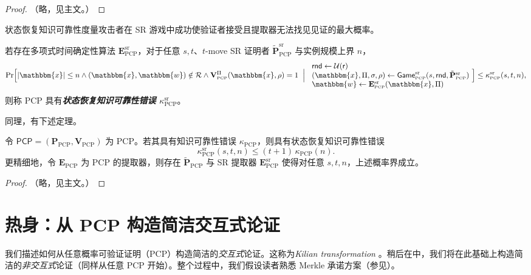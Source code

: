 \documentclass[american,singlepageview]{snargs-book-zh}
\newcommand{\defemph}[1]{\textbf{\emph{#1}}}
\newcommand{\Malicious}[1]{\tilde{#1}}
\newcommand{\StateExperiment}[1]{
\!\begin{array}{l}
#1
\end{array}\!}
\newcommand{\SomeSize}[1]{|#1|}
\newcommand{\Relation}{\mathcal{R}}
\newcommand{\Instance}{\mathbbm{x}}
\newcommand{\Witness}{\mathbbm{w}}
\newcommand{\InstanceSize}{n}
\newcommand{\ProtoProver}{P}
\newcommand{\ProtoVerifier}{V}
\newcommand{\ProtoExtractor}{E}
\newcommand{\ProtoKnowledgeError}{\kappa}
\newcommand{\ProtoRandomnessComplexity}{\mathsf{r}}
\newcommand{\SRSuperscript}{\mathrm{sr}}
\newcommand{\ProtoSRKnowledgeError}{\ProtoKnowledgeError^{\SRSuperscript}}
\newcommand{\PCPSymbol}{\mathsf{PCP}}
\newcommand{\PCPSubscript}{\scriptscriptstyle\mathrm{PCP}}
\newcommand{\PCPFormat}[1]{\mathbf{#1}}
\newcommand{\PCPProver}{\PCPFormat{\ProtoProver}_{\PCPSubscript}}
\newcommand{\PCPVerifier}{\PCPFormat{\ProtoVerifier}_{\PCPSubscript}}
\newcommand{\PCPExtractor}{\PCPFormat{\ProtoExtractor}_{\PCPSubscript}}
\newcommand{\PCPMaliciousProver}{\Malicious{\PCPFormat{\ProtoProver}}_{\PCPSubscript}}
\newcommand{\PCPSystem}{(\PCPProver,\PCPVerifier)}
\newcommand{\PCPString}{\Pi}
\newcommand{\PCPVerifierRandomMessage}{\rho}
\newcommand{\PCPKnowledgeError}{\ProtoKnowledgeError_{\PCPSubscript}}
\newcommand{\PCPRandomnessComplexity}{\ProtoRandomnessComplexity}
\newcommand{\RODistribution}[1]{\mathcal{U}(#1)}
\newcommand{\SRBudget}{t}
\newcommand{\SRSaltSize}{s}
\newcommand{\SRSaltString}{\sigma}
\newcommand{\SRRandomness}{\mathsf{rnd}}
\newcommand{\SRGameName}[1]{\mathsf{Game}_{#1}^{\SRSuperscript}}
\newcommand{\PCPStateRestorationGame}[3]{\SRGameName{\PCPSubscript}(#1,#2,#3)}
\newcommand{\PCPSRKnowledgeError}{\ProtoSRKnowledgeError_{\PCPSubscript}}
\newcommand{\PCPSRExtractor}{\PCPExtractor^{\SRSuperscript}}
\newcommand{\PCPMaliciousSRProver}{\PCPMaliciousProver^{\SRSuperscript}}
\begin{document}
\begin{proof}
（略，见主文。）
\end{proof}

状态恢复知识可靠性度量攻击者在 SR 游戏中成功使验证者接受且提取器无法找见见证的最大概率。

\begin{definition}
\label{definition:pcp-state-restoration-knowledge-soundness}
若存在多项式时间确定性算法 $\PCPSRExtractor$，对于任意 $\SRSaltSize,\SRBudget$、$\SRBudget$-move SR 证明者 $\PCPMaliciousSRProver$ 与实例规模上界 $\InstanceSize$，
\[
\Pr\Bigl[
\SomeSize{\Instance}\le\InstanceSize
\wedge
(\Instance,\Witness)\notin\Relation
\wedge
\PCPVerifier^{\PCPString}(\Instance,\PCPVerifierRandomMessage)=1
\;\Bigm|\;
\StateExperiment{
  \SRRandomness\gets\RODistribution{\PCPRandomnessComplexity}\\
  (\Instance,\PCPString,\SRSaltString,\PCPVerifierRandomMessage)\gets
    \PCPStateRestorationGame{\SRSaltSize}{\SRRandomness}{\PCPMaliciousSRProver}\\
  \Witness\gets\PCPSRExtractor(\Instance,\PCPString)
}
\Bigr]
\le
\PCPSRKnowledgeError(\SRSaltSize,\SRBudget,\InstanceSize),
\]
则称 PCP 具有\defemph{状态恢复知识可靠性错误 $\PCPSRKnowledgeError$}。
\end{definition}

同理，有下述定理。

\begin{theorem}
\label{theorem:pcp-srk-to-knowledge}
令 $\PCPSymbol=\PCPSystem$ 为 PCP。若其具有知识可靠性错误 $\PCPKnowledgeError$，则具有状态恢复知识可靠性错误
\[
\PCPSRKnowledgeError(\SRSaltSize,\SRBudget,\InstanceSize)
\le (\SRBudget+1)\,\PCPKnowledgeError(\InstanceSize).
\]
更精细地，令 $\PCPExtractor$ 为 PCP 的提取器，则存在 $\PCPMaliciousProver$ 与 SR 提取器 $\PCPSRExtractor$ 使得对任意 $\SRSaltSize,\SRBudget,\InstanceSize$，上述概率界成立。
\end{theorem}

\begin{proof}
（略，见主文。）
\end{proof}


\chapter{热身：从 PCP 构造简洁交互式论证}
\label{chapter:kilian-transformation}

我们描述如何从任意概率可验证证明（PCP）构造简洁的\emph{交互式}论证。这称为\emph{Kilian transformation} \cite{Kilian92}。稍后在中，我们将在此基础上构造简洁的\emph{非交互式}论证（同样从任意 PCP 开始）。整个过程中，我们假设读者熟悉 Merkle 承诺方案（参见）。
\end{document}

